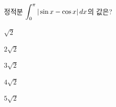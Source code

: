 정적분 $\displaystyle\int_{0}^{\pi}|\sin x-\cos x|\mkern3mu dx$의 값은?
\begin{choices32}{\rule[-3ex]{0pt}{8ex}$\sqrt{2}$}{\rule[-3ex]{0pt}{8ex}$2\sqrt{2}$}{\rule[-3ex]{0pt}{8ex}$3\sqrt{2}$}{\rule[-3ex]{0pt}{8ex}$4\sqrt{2}$}{\rule[-3ex]{0pt}{8ex}$5\sqrt{2}$}\end{choices32}
